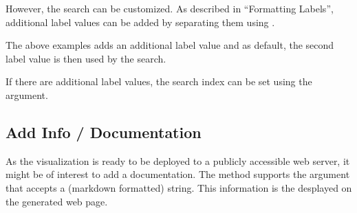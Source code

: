 \documentclass[letterpaper,10pt,english]{sphinxmanual}
\begin{document}
However, the search can be customized. As described in “Formatting Labels”, additional label values can be added by separating them using .

\begin{sphinxVerbatim}[commandchars=\\\{\}]
    
  \PYG{p}{[}\PYG{p}{]}  

    
    \PYG{p}{[}\PYG{p}{]}        

           
\end{sphinxVerbatim}

The above examples adds an additional label value and as default, the second label value is then used by the search.

\noindent{}

If there are additional label values, the search index can be set using the  argument.


\subsection{Add Info / Documentation}
\label{\detokenize{host:add-info-documentation}}
As the visualization is ready to be deployed to a publicly accessible web server, it might be of interest to add a documentation. The  method supports the argument  that accepts a (markdown formatted) string. This information is the desplayed on the generated web page.
\end{document}
